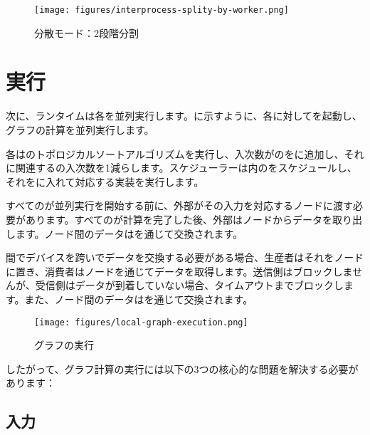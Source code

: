 \begin{content}
\begin{figure}[H]
\centering
\texttt{[image: figures/interprocess-splity-by-worker.png]}
\caption{分散モード：2段階分割}
 \label{fig:interprocess-splity-by-worker}
\end{figure}

\section{実行}
\label{sec:graph-operation-exec}

次に、ランタイムは各を並列実行します。に示すように、各に対してを起動し、グラフの計算を並列実行します。

各はのトポロジカルソートアルゴリズムを実行し、入次数がのをに追加し、それに関連するの入次数を1減らします。スケジューラーは内のをスケジュールし、それをに入れて対応する実装を実行します。

すべてのが並列実行を開始する前に、外部がその入力を対応するノードに渡す必要があります。すべてのが計算を完了した後、外部はノードからデータを取り出します。ノード間のデータはを通じて交換されます。

間でデバイスを跨いでデータを交換する必要がある場合、生産者はそれをノードに置き、消費者はノードを通じてデータを取得します。送信側はブロックしませんが、受信側はデータが到着していない場合、タイムアウトまでブロックします。また、ノード間のデータはを通じて交換されます。

\begin{figure}[H]
\centering
\texttt{[image: figures/local-graph-execution.png]}
\caption{グラフの実行}
 \label{fig:local-graph-execution}
\end{figure}

したがって、グラフ計算の実行には以下の3つの核心的な問題を解決する必要があります：

\begin{enum}
\end{enum}

\subsection{入力}


\end{content}
